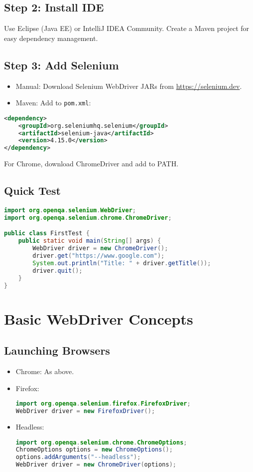 \documentclass[a4paper,12pt]{article}
\begin{document}
\subsection{Step 2: Install IDE}
Use Eclipse (Java EE) or IntelliJ IDEA Community. Create a Maven project for easy dependency management.

\subsection{Step 3: Add Selenium}
\begin{itemize}
    \item Manual: Download Selenium WebDriver JARs from \url{https://selenium.dev}.
    \item Maven: Add to \texttt{pom.xml}:
\end{itemize}

\begin{lstlisting}[language=XML]
<dependency>
    <groupId>org.seleniumhq.selenium</groupId>
    <artifactId>selenium-java</artifactId>
    <version>4.15.0</version>
</dependency>
\end{lstlisting}

For Chrome, download ChromeDriver and add to PATH.

\subsection{Quick Test}
\begin{lstlisting}[language=Java]
import org.openqa.selenium.WebDriver;
import org.openqa.selenium.chrome.ChromeDriver;

public class FirstTest {
    public static void main(String[] args) {
        WebDriver driver = new ChromeDriver();
        driver.get("https://www.google.com");
        System.out.println("Title: " + driver.getTitle());
        driver.quit();
    }
}
\end{lstlisting}

\section{Basic WebDriver Concepts}

\subsection{Launching Browsers}
\begin{itemize}
    \item Chrome: As above.
    \item Firefox:
    \begin{lstlisting}[language=Java]
import org.openqa.selenium.firefox.FirefoxDriver;
WebDriver driver = new FirefoxDriver();
    \end{lstlisting}
    \item Headless:
    \begin{lstlisting}[language=Java]
import org.openqa.selenium.chrome.ChromeOptions;
ChromeOptions options = new ChromeOptions();
options.addArguments("--headless");
WebDriver driver = new ChromeDriver(options);
    \end{lstlisting}
\end{itemize}
\end{document}
